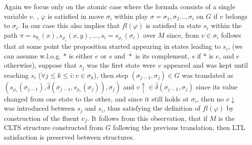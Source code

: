Again we focus only on the atomic case where the formula consists of a single variable $v$. , $\varphi$ is satisfied in move $\sigma_i$ within play $\sigma=\sigma_1,\sigma_2\ldots ,\sigma_i$ on $G$ if $v$ belongs to $\sigma_i$. In our case this also implies that $fl(\varphi)$ is satisfied in state $s_i$ within the path $\pi=s_{\theta_e}(x),s_{\rho_s}(x,y),\ldots,s_i=s_{\rho_*}(\sigma_i)$ over $M$ since, from $v \in \sigma_i$ follows that at some point the proposition started appearing in states leading to $s_i$, (we can assume w.l.o.g. $*$ is either $e$ or $s$ and $\overline{*}$ is its complement, $s$ if $*$ is $e$, and $e$ otherwise), suppose that $s_j$ was the first state were $v$ appeared and was kept until reaching $s_i$ ($\forall j \leq k \leq i: v \in \sigma_k$), then step $(\sigma_{j-1},\sigma_j) \in G$ was translated as $(s_{\rho_*}(\sigma_{j-1}), \hat{\delta}(\sigma_{j-1},s_{\rho_{\overline{*}}}(\sigma_j)),\sigma_{j})$ and $v\uparrow \in \hat{\delta}(\sigma_{j-1},\sigma_j)$ since its value changed from one state to the other, and since it still holds at $\sigma_i$, then no $v\downarrow$ was introduced between $s_j$ and $s_i$, thus satisfying the definition of $fl(\varphi)$ by construction of the fluent $v_f$. It follows from this observation, that if $M$ is the CLTS structure constructed from $G$ following the previous translation, then LTL satisfaction is preserved between structures.